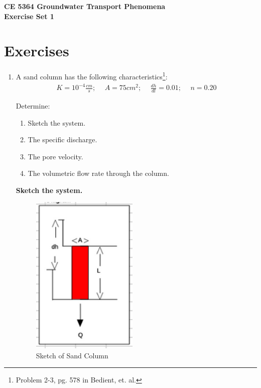 \documentclass[12pt]{article}
\begin{document}
\begin{center}
{\textbf{{ CE 5364 Groundwater Transport Phenomena } \\ {Exercise Set 1}}}
\end{center}

\section*{\small{Exercises}}
\begin{enumerate}
\item 

A sand column has the following characteristics\footnote{Problem 2-3, pg. 578 in Bedient, et. al.}:
\begin{equation}
  \begin{aligned}
    K = 10^{-4} \frac{cm}{s}; & ~~A = 75 cm^{2}; & ~~\frac{dh}{dl} = 0.01; & ~~n = 0.20 
  \end{aligned}
\end{equation}

Determine:
\begin{enumerate}
\item Sketch the system.
\item The specific discharge.
\item The pore velocity.
\item The volumetric flow rate through the column.
\end{enumerate}

\clearpage

\textbf{Sketch the system.}

\begin{figure}[h!] %
   \centering
   \includegraphics[width=2in]{es1-1-sketch.png} 
   \caption{Sketch of Sand Column}
   \label{fig:sandcolumn}
\end{figure}


\end{enumerate}
\end{document}
